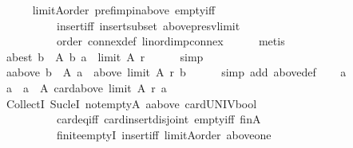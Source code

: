 \begin{isabellebody}
\ \ \ \ \isamarkupfalse%
\ limitA{\isacharunderscore}{\kern0pt}order\ pref{\isacharunderscore}{\kern0pt}imp{\isacharunderscore}{\kern0pt}in{\isacharunderscore}{\kern0pt}above\ empty{\isacharunderscore}{\kern0pt}iff\isanewline
\ \ \ \ \ \ \ \ \ \ insert{\isacharunderscore}{\kern0pt}iff\ insert{\isacharunderscore}{\kern0pt}subset\ above{\isacharunderscore}{\kern0pt}presv{\isacharunderscore}{\kern0pt}limit\isanewline
\ \ \ \ \ \ \ \ \ \ order\ connex{\isacharunderscore}{\kern0pt}def\ lin{\isacharunderscore}{\kern0pt}ord{\isacharunderscore}{\kern0pt}imp{\isacharunderscore}{\kern0pt}connex\isanewline
\ \ \ \ \isamarkupfalse%
\ metis\isanewline
\ \ \isamarkupfalse%
\ a{\isacharunderscore}{\kern0pt}best{\isacharcolon}{\kern0pt}\ {\isachardoublequoteopen}{\isasymforall}b\ {\isasymin}\ A{\isachardot}{\kern0pt}\ {\isacharparenleft}{\kern0pt}b{\isacharcomma}{\kern0pt}\ a{\isacharparenright}{\kern0pt}\ {\isasymin}\ limit\ A\ r{\isachardoublequoteclose}\isanewline
\ \ \ \ \isamarkupfalse%
\ simp\isanewline
\ \ \isamarkupfalse%
\ a{\isacharunderscore}{\kern0pt}above{\isacharcolon}{\kern0pt}\ {\isachardoublequoteopen}{\isasymforall}b\ {\isasymin}\ A{\isachardot}{\kern0pt}\ a\ {\isasymin}\ above\ {\isacharparenleft}{\kern0pt}limit\ A\ r{\isacharparenright}{\kern0pt}\ b{\isachardoublequoteclose}\isanewline
\ \ \ \ \isamarkupfalse%
\ {\isacharparenleft}{\kern0pt}simp\ add{\isacharcolon}{\kern0pt}\ above{\isacharunderscore}{\kern0pt}def{\isacharparenright}{\kern0pt}\isanewline
\ \ \isamarkupfalse%
\ a\ \isamarkupfalse%
\ {\isachardoublequoteopen}a\ {\isasymin}\ {\isacharbraceleft}{\kern0pt}a\ {\isasymin}\ A{\isachardot}{\kern0pt}\ card{\isacharparenleft}{\kern0pt}above\ {\isacharparenleft}{\kern0pt}limit\ A\ r{\isacharparenright}{\kern0pt}\ a{\isacharparenright}{\kern0pt}\ {\isasymle}\ {}{\isacharbraceright}{\kern0pt}{\isachardoublequoteclose}\isanewline
\ \ \ \ \isamarkupfalse%
\ CollectI\ Suc{\isacharunderscore}{\kern0pt}leI\ not{\isacharunderscore}{\kern0pt}empty{\isacharunderscore}{\kern0pt}A\ a{\isacharunderscore}{\kern0pt}above\ card{\isacharunderscore}{\kern0pt}UNIV{\isacharunderscore}{\kern0pt}bool\isanewline
\ \ \ \ \ \ \ \ \ \ card{\isacharunderscore}{\kern0pt}eq{\isacharunderscore}{\kern0pt}{}{\isacharunderscore}{\kern0pt}iff\ card{\isacharunderscore}{\kern0pt}insert{\isacharunderscore}{\kern0pt}disjoint\ empty{\isacharunderscore}{\kern0pt}iff\ finA\isanewline
\ \ \ \ \ \ \ \ \ \ finite{\isachardot}{\kern0pt}emptyI\ insert{\isacharunderscore}{\kern0pt}iff\ limitA{\isacharunderscore}{\kern0pt}order\ above{\isacharunderscore}{\kern0pt}one\isanewline

\end{isabellebody}
